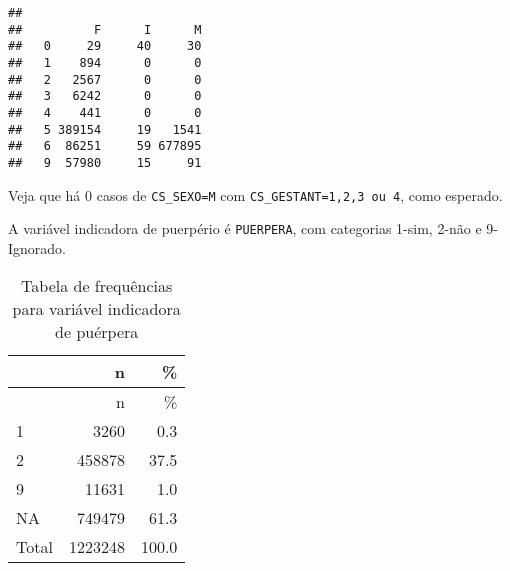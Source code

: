 \documentclass[
]{article}
\newenvironment{Shaded}{\begin{snugshade}}{\end{snugshade}}
\newcommand{\AttributeTok}[1]{\textcolor[rgb]{0.77,0.63,0.00}{#1}}
\newcommand{\CommentTok}[1]{\textcolor[rgb]{0.56,0.35,0.01}{\textit{#1}}}
\newcommand{\ConstantTok}[1]{\textcolor[rgb]{0.00,0.00,0.00}{#1}}
\newcommand{\DecValTok}[1]{\textcolor[rgb]{0.00,0.00,0.81}{#1}}
\newcommand{\FunctionTok}[1]{\textcolor[rgb]{0.00,0.00,0.00}{#1}}
\newcommand{\NormalTok}[1]{#1}
\newcommand{\SpecialCharTok}[1]{\textcolor[rgb]{0.00,0.00,0.00}{#1}}
\newcommand{\StringTok}[1]{\textcolor[rgb]{0.31,0.60,0.02}{#1}}
\begin{document}
\begin{Shaded}
\end{Shaded}

\begin{verbatim}
##    
##          F      I      M
##   0     29     40     30
##   1    894      0      0
##   2   2567      0      0
##   3   6242      0      0
##   4    441      0      0
##   5 389154     19   1541
##   6  86251     59 677895
##   9  57980     15     91
\end{verbatim}

Veja que há 0 casos de \texttt{CS\_SEXO=M} com
\texttt{CS\_GESTANT=1,2,3\ ou\ 4}, como esperado.

A variável indicadora de puerpério é \texttt{PUERPERA}, com categorias
1-sim, 2-não e 9-Ignorado.

\begin{Shaded}
\end{Shaded}

\begin{longtable}[]{@{}lrr@{}}
\caption{Tabela de frequências para variável indicadora de
puérpera}\tabularnewline
\toprule
& n & \% \\
\midrule
\endfirsthead
\toprule
& n & \% \\
\midrule
\endhead
1 & 3260 & 0.3 \\
2 & 458878 & 37.5 \\
9 & 11631 & 1.0 \\
NA & 749479 & 61.3 \\
Total & 1223248 & 100.0 \\
\bottomrule
\end{longtable}
\end{document}
